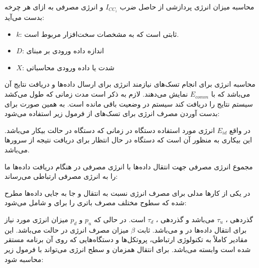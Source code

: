 \documentclass[a4paper]{article}
\begin{document}

محاسبه میزان انرژی پردازشی از حاصل ضرب $I_{CC_i}$ و انرژی مصرفی  به ازای
هر چرخه  بدست می‌آید:


\begin{itemize}
    \item $k$: ثابتی است که به مشخصات سخت‌افزار مربوط است.
    \item $D$: اندازه داده ورودی بر مبنای 
    \item $X$: شدت یا داده ورودی محاسباتی
\end{itemize}

محاسبه انرژی برای انجام تسک‌های  نیازمند انرژی برای ارسال داده‌ها
و دریافت نتایج آن می‌باشد که با $E_{comm}$ نمایش می‌دهند. لازم به ذکر است مدت
زمانی که طول می‌کشد سیستم نتایج را دریافت کند سیستم در وضعیت  باقی
مانده است. به همین صورت برای بدست آوردن مصرف انرژی برای تسک‌های 
از فرمول زیر استفاده می‌شود:


در واقع $E_{id}$ انرژی مورد استفاده دستگاه  در زمانی که دستگاه در حالت
بیکار می‌باشد. این بیکاری به منظور آن است که دستگاه  در حال انتظار برای
دریافت نتیجه از سرور‌ها می‌باشد.


مجموع انرژی مصرفی جهت انتقال داده‌ها با انرژی مصرفی در هنگام دریافت داده‌ها ما
را به انرژی مصرفی ارتباطی می‌رساند:


در یکی از کار‌ها \cite{huang2012close} مدلی برای مصرف انرژی نسبت به انتقال و جا
به جایی داده‌ها مطرح شده که سطوح مختلف مصرف باتری را برای  و
 شامل می‌شود:


گذردهی ، $\tau_u$ می‌باشد و گذردهی ، $\tau_d$ است. در
حالی که $p_u$ و $p_d$ میزان انرژی مورد نیاز برای انتقال داده‌ها در  و
 می‌باشد. ثابت $\beta$ میزان مصرف انرژی در حالت  می‌باشد.
این مقادیر کاملاً به تکنولوژی ارتباطی، پروتکل‌ها و دستگاه‌هایی که روی آن برنامه
مستقر شده است وابسته می‌‌باشد. برای انتقال همزمان  و 
سطح انرژی می‌تواند با فرمول زیر محاسبه شود:
\end{document}

